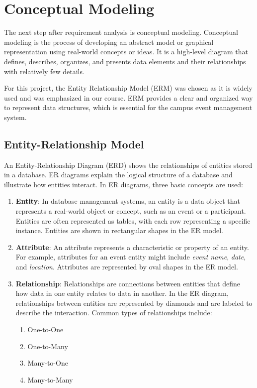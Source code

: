 \section{Conceptual Modeling}

The next step after requirement analysis is conceptual modeling. Conceptual modeling is the process of developing an abstract model or graphical representation using real-world concepts or ideas. It is a high-level diagram that defines, describes, organizes, and presents data elements and their relationships with relatively few details. 

For this project, the Entity Relationship Model (ERM) was chosen as it is widely used and was emphasized in our course. ERM provides a clear and organized way to represent data structures, which is essential for the campus event management system.

\subsection{Entity-Relationship Model}

An Entity-Relationship Diagram (ERD) shows the relationships of entities stored in a database. ER diagrams explain the logical structure of a database and illustrate how entities interact. In ER diagrams, three basic concepts are used:

\begin{enumerate}
    \item \textbf{Entity}: In database management systems, an entity is a data object that represents a real-world object or concept, such as an event or a participant. Entities are often represented as tables, with each row representing a specific instance. Entities are shown in rectangular shapes in the ER model.

    \item \textbf{Attribute}: An attribute represents a characteristic or property of an entity. For example, attributes for an event entity might include \textit{event name}, \textit{date}, and \textit{location}. Attributes are represented by oval shapes in the ER model.

    \item \textbf{Relationship}: Relationships are connections between entities that define how data in one entity relates to data in another. In the ER diagram, relationships between entities are represented by diamonds and are labeled to describe the interaction. Common types of relationships include:
    \begin{enumerate}
        \item One-to-One
        \item One-to-Many
        \item Many-to-One
        \item Many-to-Many
    \end{enumerate}
\end{enumerate}

